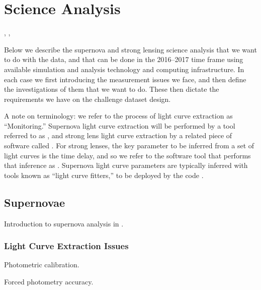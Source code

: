 \section{Science Analysis}
\label{sec:twinkles1:science}

,
,

Below we describe the supernova and strong lensing science analysis
that we want to do with the \TwinklesOne data, and that can be done
in the 2016--2017 time frame using available simulation and analysis
technology and computing infrastructure. In each case we first
introducing the measurement issues we face, and then define the
investigations of them that we want to do. These then dictate the
requirements we have on the challenge dataset design.

A note on terminology: we refer to the process of light curve
extraction as ``Monitoring.'' Supernova light curve extraction will be
performed by a  tool referred to as \SNMonitor, and strong lens light
curve extraction  by a related piece of software called \SLMonitor.
For strong lenses, the key parameter to be inferred  from a set of
light curves is the time delay, and so we refer to the software tool
that  performs that inference as \SLTimer. Supernova light curve
parameters  are typically inferred with tools known as
``light curve fitters,'' to be deployed by the code \SNDistance.



\subsection{Supernovae}
\label{sec:twinkles1:science:supernovae}

Introduction to supernova analysis in \TwinklesOne.


\subsubsection{Light Curve Extraction Issues}
\label{sec:twinkles1:science:supernovae:monitor}

Photometric calibration.

Forced photometry accuracy.

